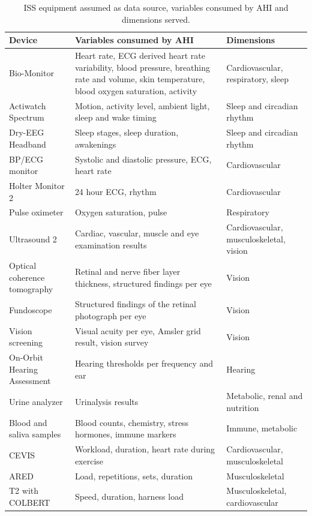 \begin{table}[htbp]
\centering
\vspace{0.8em}
\caption{ISS equipment assumed as data source, variables consumed by AHI and dimensions served.}
\label{tab:variables}
\footnotesize
\begin{tabular}{p{3.0cm}p{6.4cm}p{4.6cm}}
\hline
\textbf{Device} & \textbf{Variables consumed by AHI} & \textbf{Dimensions} \\
\hline
Bio-Monitor & Heart rate, ECG derived heart rate variability, blood pressure, breathing rate and volume, skin temperature, blood oxygen saturation, activity & Cardiovascular, respiratory, sleep \\
Actiwatch Spectrum & Motion, activity level, ambient light, sleep and wake timing & Sleep and circadian rhythm \\
Dry-EEG Headband & Sleep stages, sleep duration, awakenings & Sleep and circadian rhythm \\
BP/ECG monitor & Systolic and diastolic pressure, ECG, heart rate & Cardiovascular \\
Holter Monitor 2 & 24 hour ECG, rhythm & Cardiovascular \\
Pulse oximeter & Oxygen saturation, pulse & Respiratory \\
Ultrasound 2 & Cardiac, vascular, muscle and eye examination results & Cardiovascular, musculoskeletal, vision \\
Optical coherence tomography & Retinal and nerve fiber layer thickness, structured findings per eye & Vision \\
Fundoscope & Structured findings of the retinal photograph per eye & Vision \\
Vision screening & Visual acuity per eye, Amsler grid result, vision survey & Vision \\
On-Orbit Hearing Assessment & Hearing thresholds per frequency and ear & Hearing \\
Urine analyzer & Urinalysis results & Metabolic, renal and nutrition \\
Blood and saliva samples & Blood counts, chemistry, stress hormones, immune markers & Immune, metabolic \\
CEVIS & Workload, duration, heart rate during exercise & Cardiovascular, musculoskeletal \\
ARED & Load, repetitions, sets, duration & Musculoskeletal \\
T2 with COLBERT & Speed, duration, harness load & Musculoskeletal, cardiovascular \\

\end{tabular}
\end{table}
